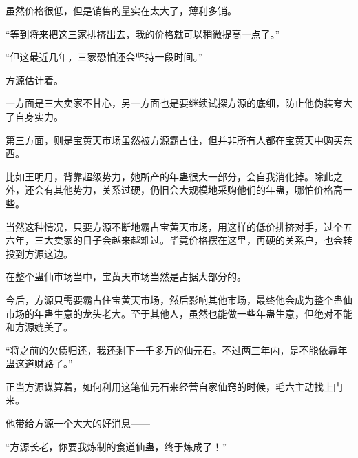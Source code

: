 \begin{this_body}
虽然价格很低，但是销售的量实在太大了，薄利多销。

“等到将来把这三家排挤出去，我的价格就可以稍微提高一点了。”

“但这最近几年，三家恐怕还会坚持一段时间。”

方源估计着。

一方面是三大卖家不甘心，另一方面也是要继续试探方源的底细，防止他伪装夸大了自身实力。

第三方面，则是宝黄天市场虽然被方源霸占住，但并非所有人都在宝黄天中购买东西。

比如王明月，背靠超级势力，她所产的年蛊很大一部分，会自我消化掉。除此之外，还会有其他势力，关系过硬，仍旧会大规模地采购他们的年蛊，哪怕价格高一些。

当然这种情况，只要方源不断地霸占宝黄天市场，用这样的低价排挤对手，过个五六年，三大卖家的日子会越来越难过。毕竟价格摆在这里，再硬的关系户，也会转投到方源这边。

在整个蛊仙市场当中，宝黄天市场当然是占据大部分的。

今后，方源只需要霸占住宝黄天市场，然后影响其他市场，最终他会成为整个蛊仙市场的年蛊生意的龙头老大。至于其他人，虽然也能做一些年蛊生意，但绝对不能和方源媲美了。

“将之前的欠债归还，我还剩下一千多万的仙元石。不过两三年内，是不能依靠年蛊这道财路了。”

正当方源谋算着，如何利用这笔仙元石来经营自家仙窍的时候，毛六主动找上门来。

他带给方源一个大大的好消息——

“方源长老，你要我炼制的食道仙蛊，终于炼成了！”

\end{this_body}

